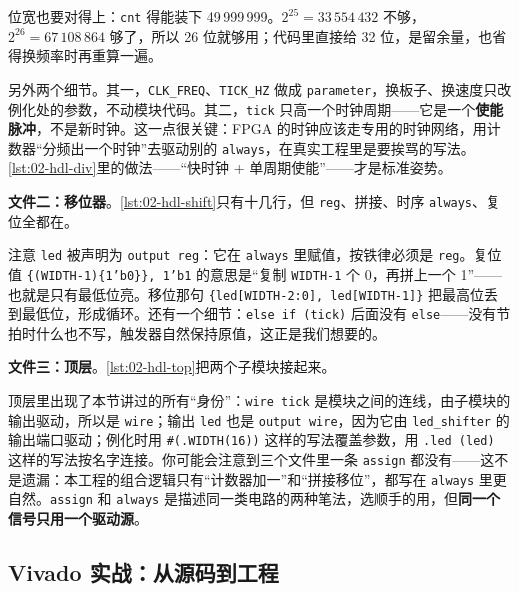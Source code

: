 位宽也要对得上：\texttt{cnt} 得能装下 49\,999\,999。$2^{25}=33\,554\,432$ 不够，$2^{26}=67\,108\,864$ 够了，所以 26 位就够用；代码里直接给 32 位，是留余量，也省得换频率时再重算一遍。

另外两个细节。其一，\texttt{CLK\_FREQ}、\texttt{TICK\_HZ} 做成 \texttt{parameter}，换板子、换速度只改例化处的参数，不动模块代码。其二，\texttt{tick} 只高一个时钟周期——它是一个\textbf{使能脉冲}，不是新时钟。这一点很关键：FPGA 的时钟应该走专用的时钟网络，用计数器“分频出一个时钟”去驱动别的 \texttt{always}，在真实工程里是要挨骂的写法。\cref{lst:02-hdl-div}里的做法——“快时钟 + 单周期使能”——才是标准姿势。

\textbf{文件二：移位器}。\cref{lst:02-hdl-shift}只有十几行，但 \texttt{reg}、拼接、时序 \texttt{always}、复位全都在。



注意 \texttt{led} 被声明为 \texttt{output reg}：它在 \texttt{always} 里赋值，按铁律必须是 \texttt{reg}。复位值 \texttt{\{(WIDTH-1)\{1'b0\}\}, 1'b1} 的意思是“复制 \texttt{WIDTH-1} 个 0，再拼上一个 1”——也就是只有最低位亮。移位那句 \texttt{\{led[WIDTH-2:0], led[WIDTH-1]\}} 把最高位丢到最低位，形成循环。还有一个细节：\texttt{else if (tick)} 后面没有 \texttt{else}——没有节拍时什么也不写，触发器自然保持原值，这正是我们想要的。

\textbf{文件三：顶层}。\cref{lst:02-hdl-top}把两个子模块接起来。



顶层里出现了本节讲过的所有“身份”：\texttt{wire tick} 是模块之间的连线，由子模块的输出驱动，所以是 \texttt{wire}；输出 \texttt{led} 也是 \texttt{output wire}，因为它由 \texttt{led\_shifter} 的输出端口驱动；例化时用 \lstinline|#(.WIDTH(16))| 这样的写法覆盖参数，用 \lstinline|.led (led)| 这样的写法按名字连接。你可能会注意到三个文件里一条 \texttt{assign} 都没有——这不是遗漏：本工程的组合逻辑只有“计数器加一”和“拼接移位”，都写在 \texttt{always} 里更自然。\texttt{assign} 和 \texttt{always} 是描述同一类电路的两种笔法，选顺手的用，但\textbf{同一个信号只用一个驱动源}。

\subsection{Vivado 实战：从源码到工程}
\label{subsec:02-hdl-vivado-lab}

